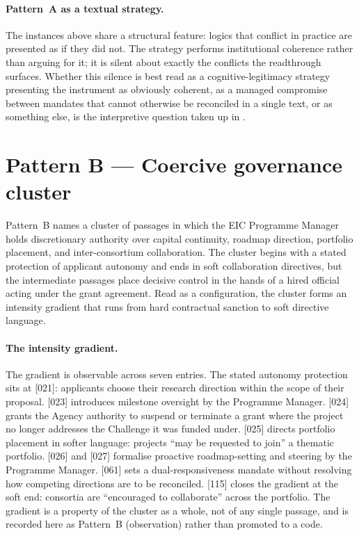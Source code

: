 \paragraph{Pattern~A as a textual strategy.}
The instances above share a structural feature: logics that conflict
in practice are presented as if they did not. The strategy performs
institutional coherence rather than arguing for it; it is silent
about exactly the conflicts the readthrough surfaces. Whether this
silence is best read as a cognitive-legitimacy strategy presenting
the instrument as obviously coherent, as a managed compromise between
mandates that cannot otherwise be reconciled in a single text, or as
something else, is the interpretive question taken up in
.

\section{Pattern B --- Coercive governance cluster}
\label{sec:res-pattern-b}

Pattern~B names a cluster of passages in which the EIC Programme
Manager holds discretionary authority over capital continuity,
roadmap direction, portfolio placement, and inter-consortium
collaboration. The cluster begins with a stated protection of
applicant autonomy and ends in soft collaboration directives, but the
intermediate passages place decisive control in the hands of a hired
official acting under the grant agreement. Read as a configuration,
the cluster forms an intensity gradient that runs from hard
contractual sanction to soft directive language.

\paragraph{The intensity gradient.}
The gradient is observable across seven entries. The stated autonomy
protection sits at [021]: applicants choose their research direction
within the scope of their proposal. [023] introduces milestone
oversight by the Programme Manager. [024] grants the Agency authority
to suspend or terminate a grant where the project no longer addresses
the Challenge it was funded under. [025] directs portfolio placement
in softer language: projects \enquote{may be requested to join} a
thematic portfolio. [026] and [027] formalise proactive
roadmap-setting and steering by the Programme Manager. [061] sets a
dual-responsiveness mandate without resolving how competing
directions are to be reconciled. [115] closes the gradient at the
soft end: consortia are \enquote{encouraged to collaborate} across
the portfolio. The gradient is a property of the cluster as a whole,
not of any single passage, and is recorded here as Pattern~B
(observation) rather than promoted to a code.

